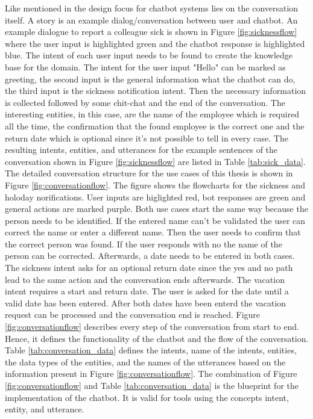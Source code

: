  Like mentioned in \citet{folstad2017chatbots} the design focus for chatbot systems lies on the conversation itself.
 A story is an example dialog/conversation between user and chatbot. 
 An example dialogue to report a colleague sick is shown in Figure \ref{fig:sicknessflow} 
 where the user input is highlighted green and the chatbot response is highlighted blue.
 The intent of each user input needs to be found to create the knowledge base for the domain. 
 The intent for the user input "Hello" can be marked as greeting, the second input is the general information what the chatbot can do, 
 the third input is the sickness notification intent. Then the necessary information is collected followed by some chit-chat and the end of the conversation. 
 The interesting entities, in this case, are the name of the employee which is required all the time, the confirmation that the found employee is the 
 correct one and the return date which is optional since it's not possible to tell in every case. 
 The resulting intents, entities, and utterances for the example sentences of the conversation 
 shown in Figure \ref{fig:sicknessflow} are listed in Table \ref{tab:sick_data}.
 The detailed conversation structure for the use cases of this thesis is shown in 
 Figure \ref{fig:conversationflow}. 
 The figure shows the flowcharts for the sickness and holoday norifications.
 User inputs are higlighted red, bot responses are green and general actions are marked purple.
 Both use cases start the same way because the person needs to be identified.
 If the entered name can't be validated the user can correct the name or enter a different name.
 Then the user needs to confirm that the correct person was found.
 If the user responds with no the name of the person can be corrected.
 Afterwards, a date needs to be entered in both cases. 
 The sickness intent asks for an optional return date since the yes and no path lead to the same action 
 and the conversation ends afterwards.
 The vacation intent requires a start and return date.
 The user is asked for the date until a valid date has been entered.
 After both dates have been enterd the vacation request can be processed and the conversation end is reached.
 Figure \ref{fig:conversationflow} describes every step of the conversation from start to end.
 Hence, it defines the functionality of the chatbot and the flow of the conversation.
 Table \ref{tab:conversation_data} defines the intents, name of the intents, entities, the data types of the entities,
 and the names of the utterances based on the information present in Figure \ref{fig:conversationflow}.
 The combination of Figure \ref{fig:conversationflow} and Table \ref{tab:conversation_data} is the 
 blueprint for the implementation of the chatbot.
 It is valid for tools using the concepts intent, entity, and utterance.
 
